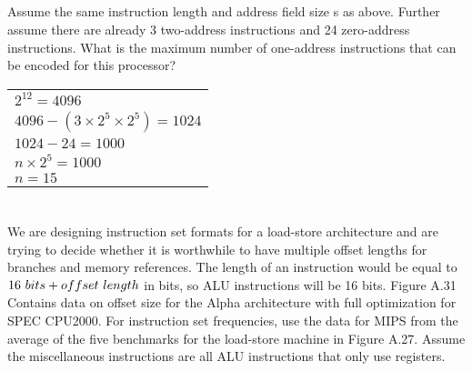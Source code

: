 \documentclass{article}
\begin{document}
\subsection{}
Assume the same instruction length and address field size s as above. Further assume there are already 3 two-address instructions and 24 zero-address instructions. What is the maximum number of one-address instructions that can be encoded for this processor?\\
\vspace{5mm}

\begin{tabular}{l}
$2^{12}=4096$ \\
$4096-(3\times2^{5}\times2^{5})=1024$\\
$1024-24=1000$\\
$n\times2^{5}=1000$\\
$n=15$
\end{tabular}
\vspace{1cm}
\pagebreak
\section{}
We are designing instruction set formats for a load-store architecture and are trying to decide whether it is worthwhile to have multiple offset lengths for branches and memory references. The length of an instruction would be equal to $16\ bits+\mathnormal{offset}\ length$ in bits, so ALU instructions will be 16 bits. Figure A.31 Contains data on offset size for the Alpha architecture with full optimization for SPEC CPU2000. For instruction set frequencies, use the data for MIPS from the average of the five benchmarks for the load-store machine in Figure A.27. Assume the miscellaneous instructions are all ALU instructions that only use registers.\\
\end{document}
